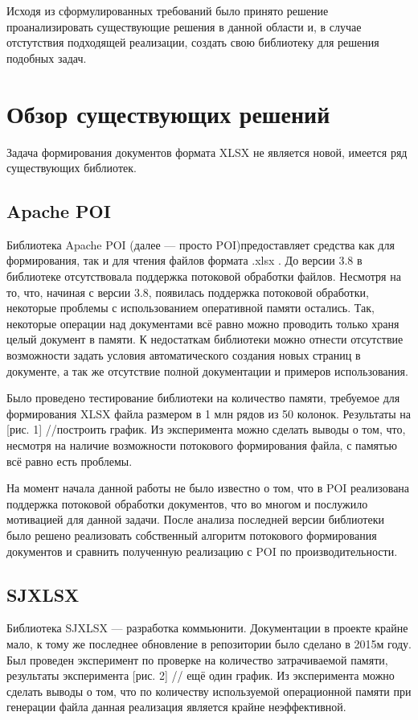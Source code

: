 \documentclass[14pt]{matmex-diploma}
\begin{document}
Исходя из сформулированных требований было принято решение проанализировать существующие решения в данной области и, в случае отстутствия подходящей реализации, создать свою библиотеку для решения подобных задач.
\section{Обзор существующих решений}
Задача формирования документов формата XLSX не является новой, имеется ряд существующих библиотек.
\subsection{Apache POI}
    Библиотека Apache POI (далее --- просто POI)предоставляет средства как для формирования, так и для чтения файлов формата .xlsx . До версии 3.8 в библиотеке отсутствовала поддержка потоковой обработки файлов. Несмотря на то, что, начиная с версии 3.8, появилась поддержка потоковой обработки, некоторые проблемы с использованием оперативной памяти остались. Так, некоторые операции над документами всё равно можно проводить только храня целый документ в памяти. К недостаткам библиотеки можно отнести отсутствие возможности задать условия автоматического создания новых страниц в документе, а так же отсутствие полной документации и примеров использования.
    
    Было проведено тестирование библиотеки на количество памяти, требуемое для формирования XLSX файла размером в 1 млн рядов из 50 колонок. Результаты на [рис. 1] //построить график. Из эксперимента можно сделать выводы о том, что, несмотря на наличие возможности потокового формирования файла, с памятью всё равно есть проблемы. 
    
    На момент начала данной работы не было известно о том, что в POI реализована поддержка потоковой обработки документов, что во многом и послужило мотивацией для данной задачи. После анализа последней версии библиотеки было решено реализовать собственный алгоритм потокового формирования документов и сравнить полученную реализацию с POI по производительности.
    
\subsection{SJXLSX}
    Библиотека SJXLSX --- разработка коммьюнити. Документации в проекте крайне мало, к тому же последнее обновление в репозитории было сделано в 2015м году. Был проведен эксперимент по проверке на количество затрачиваемой памяти, результаты эксперимента [рис. 2] // ещё один график. Из эксперимента можно сделать выводы о том, что по количеству используемой операционной памяти при генерации файла данная реализация является крайне неэффективной.
    
\end{document}
